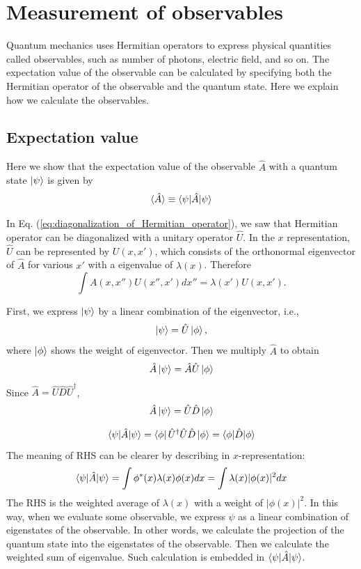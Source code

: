 \section{Measurement of observables}
Quantum mechanics uses Hermitian operators to express physical quantities called observables, such as number of photons, electric field, and so on. The expectation value of the observable can be calculated by specifying both the Hermitian operator of the observable and the quantum state. Here we explain how we calculate the observables.
 
\subsection{Expectation value}
Here we show that the expectation value of the observable $\hat A$ with a quantum state $\ket \psi$ is given by
\begin{equation}
  \braket{\hat A} \equiv \braket{\psi|\hat A|\psi}
\end{equation}

In Eq. (\ref{eq:diagonalization_of_Hermitian_operator}), we saw that Hermitian operator can be diagonalized with a unitary operator $\hat U$. In the $x$ representation, $\hat U$ can be represented by $U(x,x')$, which consists of the orthonormal eigenvector of $\hat A$ for various $x'$ with a eigenvalue of $\lambda(x)$. Therefore
\begin{equation}
  \int A(x,x'')U(x'', x')dx'' = \lambda(x')U(x,x').
\end{equation}

First, we express $\ket \psi$ by a linear combination of the eigenvector, i.e.,
\begin{equation}
  \ket \psi = \hat U \ket \phi,
\end{equation}
where $\ket \phi$ shows the weight of eigenvector. Then we multiply $\hat A$ to obtain
\begin{equation}
  \hat A \ket \psi = \hat A \hat U \ket \phi
\end{equation}
Since $\hat A = \hat U\hat D\hat U^\dagger$,
\begin{equation}
  \hat A \ket \psi = \hat U\hat D \ket \phi
\end{equation}

\begin{equation}
  \braket{\psi|\hat A | \psi} = \bra \phi \hat U^\dagger \hat U \hat D \ket \phi = \braket {\phi|\hat D|\phi}
\end{equation}
The meaning of RHS can be clearer by describing in $x$-representation:
\begin{equation}
    \braket{\psi|\hat A | \psi}= \int \phi^*(x)\lambda(x)\phi(x)dx = \int \lambda(x)|\phi(x)|^2 dx
\end{equation}
The RHS is the weighted average of $\lambda(x)$ with a weight of $|\phi(x)|^2$.
In this way, when we evaluate some observable, we express $\psi$ as a linear combination of eigenstates of the observable. In other words, we calculate the projection of the quantum state into the eigenstates of the observable. Then we calculate the weighted sum of eigenvalue. Such calculation is embedded in $\braket{\psi|\hat A|\psi}$.

